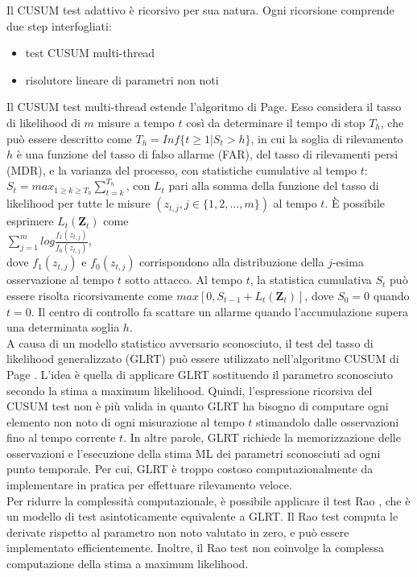 Il CUSUM test adattivo è ricorsivo per sua natura. Ogni ricorsione comprende due step interfogliati:
\begin{itemize}
	\item test CUSUM multi-thread
	\item risolutore lineare di parametri non noti
\end{itemize}
Il CUSUM test multi-thread estende l'algoritmo di Page. Esso considera il tasso di likelihood di $m$ misure a tempo $t$ così da determinare il tempo di stop $T_h$, che può essere descritto come $T_h = Inf\lbrace t \geq 1 | S_t > h \rbrace$, in cui la soglia di rilevamento $h$ è una funzione del tasso di falso allarme (FAR), del tasso di rilevamenti persi (MDR), e la varianza del processo, con statistiche cumulative al tempo $t$: $S_t = max_{1\geq k \geq T_h}\sum_{t=k}^{T_h}$, con $L_t$ pari alla somma della funzione del tasso di likelihood per tutte le misure $(z_{t,j}, j \in \lbrace1, 2, \ldots, m\rbrace)$ al tempo $t$. È possibile esprimere $L_t(\textbf{Z}_t)$ come\\
\indent $\sum_{j=1}^{m}log\frac{f_1(z_{t,j})}{f_0(z_{t,j})}$,\\
dove $f_1(z_{t,j})$ e $f_0(z_{t,j})$ corrispondono alla distribuzione della $j$-esima osservazione al tempo $t$ sotto attacco. Al tempo $t$, la statistica cumulativa $S_t$ può essere risolta ricorsivamente come $max[0, S_{t-1} + L_t(\textbf{Z}_t)]$, dove $S_0 = 0$ quando $t = 0$. Il centro di controllo fa scattare un allarme quando l'accumulazione supera una determinata soglia $h$.\\
A causa di un modello statistico avversario sconosciuto, il test del tasso di likelihood generalizzato (GLRT) può essere utilizzato nell'algoritmo CUSUM di Page \cite{lorden}. L'idea è quella di applicare GLRT sostituendo il parametro sconosciuto secondo la stima a maximum likelihood. Quindi, l'espressione ricorsiva del CUSUM test non è più valida in quanto GLRT ha bisogno di computare ogni elemento non noto di ogni misurazione al tempo $t$ stimandolo dalle osservazioni fino al tempo corrente $t$. In altre parole, GLRT richiede la memorizzazione delle osservazioni e l'esecuzione della stima ML dei parametri sconosciuti ad ogni punto temporale. Per cui, GLRT è troppo costoso computazionalmente da implementare in pratica per effettuare rilevamento veloce.\\
Per ridurre la complessità computazionale, è possibile applicare il test Rao \cite{lorden}, che è un modello di test asintoticamente equivalente a GLRT. Il Rao test computa le derivate rispetto al parametro non noto valutato in zero, e può essere implementato efficientemente. Inoltre, il Rao test non coinvolge la complessa computazione della stima a maximum likelihood.\\
